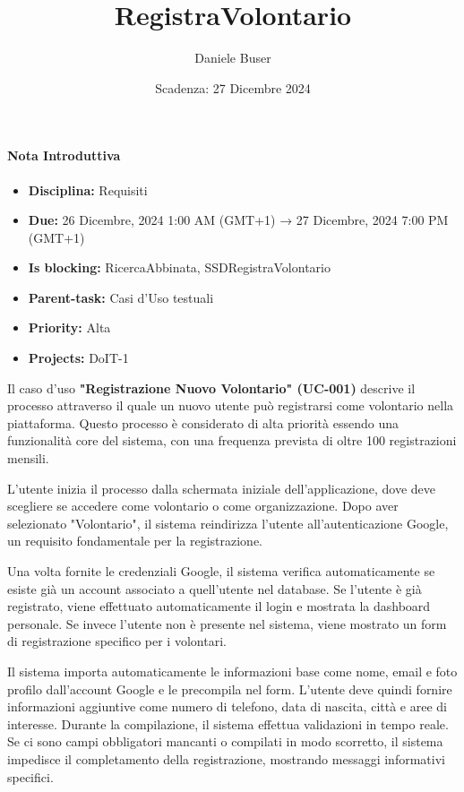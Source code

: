 \title{RegistraVolontario}
\author{Daniele Buser}
\date{Scadenza: 27 Dicembre 2024}
\paragraph{Nota Introduttiva}
\begin{itemize}
\item \textbf{Disciplina:} Requisiti
\item \textbf{Due:} 26 Dicembre, 2024 1:00 AM (GMT+1) → 27 Dicembre, 2024 7:00 PM (GMT+1)
\item \textbf{Is blocking:} RicercaAbbinata, SSDRegistraVolontario
\item \textbf{Parent-task:} Casi d'Uso testuali
\item \textbf{Priority:} Alta
\item \textbf{Projects:} DoIT-1
\end{itemize}

Il caso d'uso \textbf{"Registrazione Nuovo Volontario" (UC-001)} descrive il processo attraverso il quale un nuovo utente può registrarsi come volontario nella piattaforma. Questo processo è considerato di alta priorità essendo una funzionalità core del sistema, con una frequenza prevista di oltre 100 registrazioni mensili.

L'utente inizia il processo dalla schermata iniziale dell'applicazione, dove deve scegliere se accedere come volontario o come organizzazione. Dopo aver selezionato "Volontario", il sistema reindirizza l'utente all'autenticazione Google, un requisito fondamentale per la registrazione.

Una volta fornite le credenziali Google, il sistema verifica automaticamente se esiste già un account associato a quell'utente nel database. Se l'utente è già registrato, viene effettuato automaticamente il login e mostrata la dashboard personale. Se invece l'utente non è presente nel sistema, viene mostrato un form di registrazione specifico per i volontari.

Il sistema importa automaticamente le informazioni base come nome, email e foto profilo dall'account Google e le precompila nel form. L'utente deve quindi fornire informazioni aggiuntive come numero di telefono, data di nascita, città e aree di interesse. Durante la compilazione, il sistema effettua validazioni in tempo reale. Se ci sono campi obbligatori mancanti o compilati in modo scorretto, il sistema impedisce il completamento della registrazione, mostrando messaggi informativi specifici.

